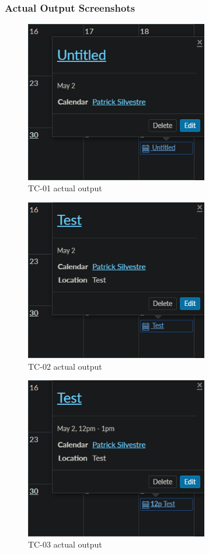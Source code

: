\documentclass[10pt,letterpaper]{article}
\begin{document}
\newpage
\subsubsection{Actual Output Screenshots}
\begin{figure}[h]
	\centerline{\includegraphics[width=8cm]{screenshots/tc01-actual-output.png}}
	\caption{TC-01 actual output}
\end{figure}
\begin{figure}[h]
	\centerline{\includegraphics[width=8cm]{screenshots/tc02-actual-output.png}}
	\caption{TC-02 actual output}
\end{figure}
\begin{figure}[h]
	\centerline{\includegraphics[width=8cm]{screenshots/tc03-actual-output.png}}
	\caption{TC-03 actual output}
\end{figure}
\end{document}
